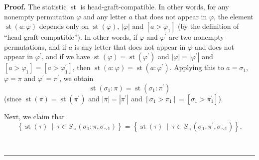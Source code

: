 \documentclass[numbers=enddot,12pt,final,onecolumn,notitlepage]{scrartcl}%
\theoremstyle{definition}
\newenvironment{proof}[1][Proof]{\noindent\textbf{#1.} }{\ \rule{0.5em}{0.5em}}
\begin{document}
\begin{proof}
The statistic $\operatorname*{st}$ is head-graft-compatible. In other words,
for any nonempty permutation $\varphi$ and any letter $a$ that does not appear
in $\varphi$, the element $\operatorname*{st}\left(  a:\varphi\right)  $
depends only on $\operatorname*{st}\left(  \varphi\right)  $, $\left\vert
\varphi\right\vert $ and $\left[  a>\varphi_{1}\right]  $ (by the definition
of \textquotedblleft head-graft-compatible\textquotedblright). In other words,
if $\varphi$ and $\varphi^{\prime}$ are two nonempty permutations, and if $a$
is any letter that does not appear in $\varphi$ and does not appear in
$\varphi^{\prime}$, and if we have $\operatorname*{st}\left(  \varphi\right)
=\operatorname*{st}\left(  \varphi^{\prime}\right)  $ and $\left\vert
\varphi\right\vert =\left\vert \varphi^{\prime}\right\vert $ and $\left[
a>\varphi_{1}\right]  =\left[  a>\varphi_{1}^{\prime}\right]  $, then
$\operatorname*{st}\left(  a:\varphi\right)  =\operatorname*{st}\left(
a:\varphi^{\prime}\right)  $. Applying this to $a=\sigma_{1}$, $\varphi=\pi$
and $\varphi^{\prime}=\pi^{\prime}$, we obtain
\[
\operatorname*{st}\left(  \sigma_{1}:\pi\right)  =\operatorname*{st}\left(
\sigma_{1}:\pi^{\prime}\right)
\]
(since $\operatorname*{st}\left(  \pi\right)  =\operatorname*{st}\left(
\pi^{\prime}\right)  $ and $\left\vert \pi\right\vert =\left\vert \pi^{\prime
}\right\vert $ and $\left[  \sigma_{1}>\pi_{1}\right]  =\left[  \sigma_{1}%
>\pi_{1}^{\prime}\right]  $).

Next, we claim that%
\begin{equation}
\left\{  \operatorname*{st}\left(  \tau\right)  \ \mid\ \tau\in S_{\prec
}\left(  \sigma_{1}:\pi,\sigma_{\sim1}\right)  \right\}  =\left\{
\operatorname*{st}\left(  \tau\right)  \ \mid\ \tau\in S_{\prec}\left(
\sigma_{1}:\pi^{\prime},\sigma_{\sim1}\right)  \right\}  .
\label{pf.thm.head-comp.LRcomp.c1.pf.5}%
\end{equation}



\end{proof}
\end{document}
